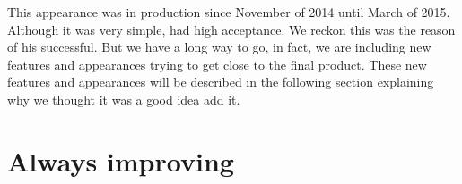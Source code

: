 \documentclass[a4paper, 12pt]{book}
\begin{document}
This appearance was in production since November of 2014 until March of 
2015. Although it was very simple, had high acceptance. We reckon this was 
the reason of his successful. But we have a long way to go, in fact, we are
including new features and appearances trying to get close to the final product.
These new features and appearances will be described in the following section
explaining why we thought it was a good idea add it.


\section{Always improving}
\end{document}
